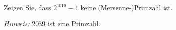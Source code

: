 
\begin{exercise}

Zeigen Sie, dass $2^{1019} - 1$ keine (Mersenne-)Primzahl ist.

\textit{Hinweis:} 2039 ist eine Primzahl.

\end{exercise}


\begin{solution}

\phantom{}

\end{solution}


